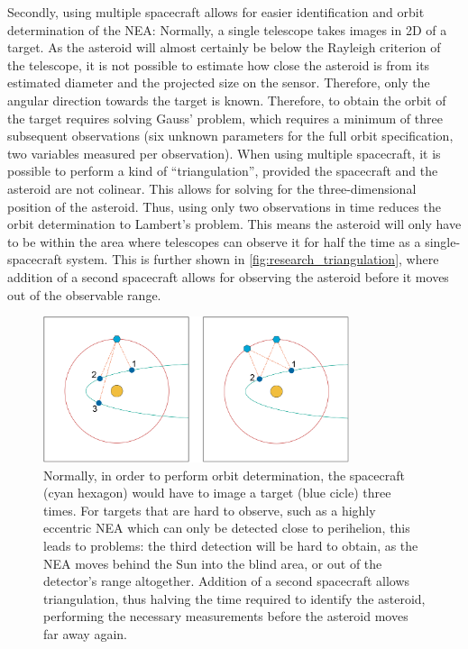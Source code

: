 Secondly, using multiple spacecraft allows for easier identification and orbit determination of the NEA: Normally, a single telescope takes images in 2D of a target. As the asteroid will almost certainly be below the Rayleigh criterion of the telescope, it is not possible to estimate how close the asteroid is from its estimated diameter and the projected size on the sensor. Therefore, only the angular direction towards the target is known. Therefore, to obtain the orbit of the target requires solving Gauss' problem, which requires a minimum of three subsequent observations (six unknown parameters for the full orbit specification, two variables measured per observation). When using multiple spacecraft, it is possible to perform a kind of ``triangulation'', provided the spacecraft and the asteroid are not colinear. This allows for solving for the three-dimensional position of the asteroid. Thus, using only two observations in time reduces the orbit determination to Lambert's problem. This means the asteroid will only have to be within the area where telescopes can observe it for half the time as a single-spacecraft system. This is further shown in \autoref{fig:research_triangulation}, where addition of a second spacecraft allows for observing the asteroid before it moves out of the observable range.\\

\begin{figure}[htbp]
 \centering
 \includegraphics[width=0.8\textwidth]{img/research_triangulation.png}
 \caption{Normally, in order to perform orbit determination, the spacecraft (cyan hexagon) would have to image a target (blue cicle) three times. For targets that are hard to observe, such as a highly eccentric NEA which can only be detected close to perihelion, this leads to problems: the third detection will be hard to obtain, as the NEA moves behind the Sun into the blind area, or out of the detector's range altogether. Addition of a second spacecraft allows triangulation, thus halving the time required to identify the asteroid, performing the necessary measurements before the asteroid moves far away again.}
 \label{fig:research_triangulation}
\end{figure}


